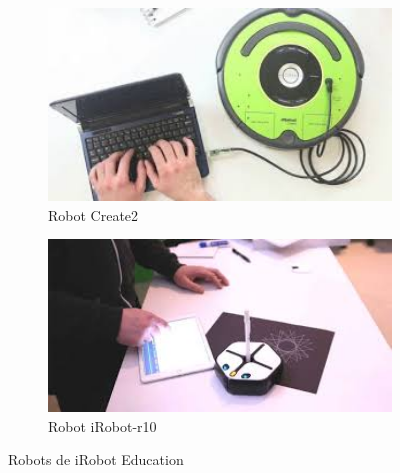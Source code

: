 \documentclass{report}
\begin{document}
\renewcommand{\figurename}{Figura}		
\begin{figure}[h]
\centering
  \begin{subfigure}[b]{0.24\textwidth}
  \centering
    \includegraphics[width=1.6\textwidth, height=\textwidth]{images/irobot.jpeg}
    \caption{Robot Create2}
    \label{fig:f1}
  \end{subfigure}\hspace{0.15\textwidth}
    \begin{subfigure}[b]{0.24\textwidth}
    \centering
    \includegraphics[width=1.6\textwidth, height=\textwidth]{images/irobot-r10.jpeg}
    \caption{Robot iRobot-r10}
    \label{fig:f2}
  	\end{subfigure}
  	\caption{Robots de iRobot Education}
\end{figure}
\end{document}
